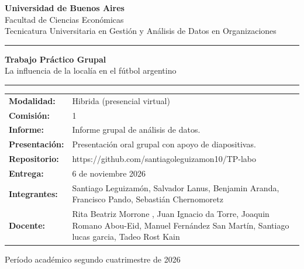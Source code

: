\documentclass[12pt,a4paper]{article}
\newcommand{\institucion}{Universidad de Buenos Aires}
\newcommand{\facultad}{Facultad de Ciencias Económicas}
\newcommand{\carrera}{Tecnicatura Universitaria en Gestión y Análisis de Datos en Organizaciones}
\newcommand{\tituloTrabajo}{Trabajo Práctico Grupal}
\newcommand{\subtituloTrabajo}{La influencia de la localía en el fútbol argentino}
\begin{document}
\thispagestyle{empty}
\begin{center}
    {\large\bfseries \institucion}\\[0.25em]
    {\large \facultad}\\[0.25em]
    {\normalsize \carrera}
\end{center}

\vspace{1.4cm}
\noindent\rule{\textwidth}{0.7pt}

\vspace{1.5cm}
\begin{center}
    {\LARGE\bfseries \tituloTrabajo}\\[0.8em]
    {\large \subtituloTrabajo}
\end{center}

\vspace{1.4cm}
\noindent\rule{\textwidth}{0.4pt}
\vspace{0.5em}

\renewcommand{\arraystretch}{1.45}
\noindent\begin{tabular}{@{}>{\bfseries}p{}p{}@{}}
Modalidad: & Hibrida (presencial virtual) \\
Comisión: & 1 \\
Informe: & Informe grupal de análisis de datos. \\
Presentación: & Presentación oral grupal con apoyo de diapositivas. \\
Repositorio: & https://github.com/santiagoleguizamon10/TP-labo \\
Entrega: & 6 de noviembre 2026 \\
Integrantes: & Santiago Leguizamón, Salvador Lanus, Benjamin Aranda, Francisco Pando,
Sebastián Chernomoretz \\
Docente: &  Rita Beatriz Morrone , Juan Ignacio da Torre, Joaquin Romano Abou-Eid, Manuel Fernández San Martín, Santiago lucas garcia, Tadeo Rost Kain
 \\
\end{tabular}

\vfill
\begin{center}
    {\large Período académico segundo cuatrimestre de 2026}
\end{center}
\clearpage

\end{document}

